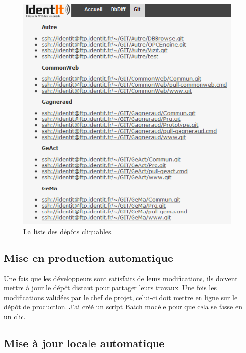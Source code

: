 \begin{figure}
    \begin{center}
        \includegraphics[scale=0.7]{images/repo.png}
        \caption{La liste des dépôts cliquables.}
        \label{repo}
    \end{center}
\end{figure}

\subsection{Mise en production automatique} %
\label{sub:Mise en production automatique}

Une fois que les développeurs sont satisfaits de leurs modifications,
ils doivent mettre à jour le dépôt distant pour partager leurs travaux.
Une fois les modifications validées par le chef de projet, celui-ci doit
mettre en ligne sur le dépôt de production. J'ai créé un script Batch
\og modèle \fg{} pour que cela se fasse en un clic.\\

\subsection{Mise à jour locale automatique} %
\label{sub:Mise à jour locale automatique}

